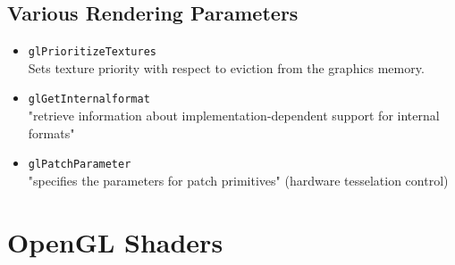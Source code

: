 \documentclass[12pt]{article}
\begin{document}
\subsection{Various Rendering Parameters}
\begin{itemize}
\item \texttt{glPrioritizeTextures} \\
	Sets texture priority with respect to eviction from the graphics memory.
\item \texttt{glGetInternalformat} \\
	"retrieve information about implementation-dependent support for internal formats"
\item \texttt{glPatchParameter} \\
	"specifies the parameters for patch primitives" (hardware tesselation control)
\end{itemize}

\section{OpenGL Shaders}
\end{document}
